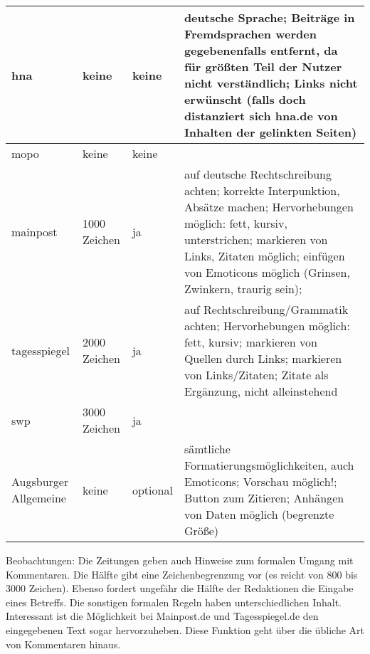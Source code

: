 \begin{landscape}
\begin{longtable}{l|llp{100mm}}
hna			& keine & keine & deutsche Sprache; Beiträge in Fremdsprachen werden gegebenenfalls entfernt, da für größten Teil der Nutzer nicht verständlich; Links nicht erwünscht (falls doch distanziert sich hna.de von Inhalten der gelinkten Seiten) \\\hline
mopo			& keine & keine & \\\hline
mainpost		& 1000 Zeichen & ja & auf deutsche Rechtschreibung achten; korrekte Interpunktion, Absätze machen; Hervorhebungen möglich: fett, kursiv, unterstrichen; markieren von Links, Zitaten möglich; einfügen von Emoticons möglich (Grinsen, Zwinkern, traurig sein); \\\hline
tagesspiegel		& 2000 Zeichen & ja & auf Rechtschreibung/Grammatik achten; Hervorhebungen möglich: fett, kursiv; markieren von Quellen durch Links; markieren von Links/Zitaten; Zitate als Ergänzung, nicht alleinstehend \\\hline
swp			& 3000 Zeichen & ja & \\ \hline
Augsburger Allgemeine	& keine & optional & sämtliche Formatierungsmöglichkeiten, auch Emoticons; Vorschau möglich!; Button zum Zitieren; Anhängen von Daten möglich (begrenzte Größe)\\ \hline

\end{longtable}
\end{landscape}

Beobachtungen:
Die Zeitungen geben auch Hinweise zum formalen Umgang mit Kommentaren. Die Hälfte gibt eine Zeichenbegrenzung vor (es reicht von 800 bis 3000 Zeichen). 
Ebenso fordert ungefähr die Hälfte der Redaktionen die Eingabe eines Betreffs. Die sonstigen formalen Regeln haben unterschiedlichen Inhalt. Interessant ist die Möglichkeit bei Mainpost.de und Tagesspiegel.de den eingegebenen Text sogar hervorzuheben. Diese Funktion geht über die übliche Art von Kommentaren hinaus. 

